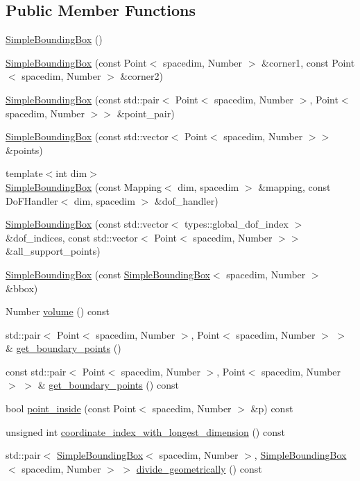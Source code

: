 \subsection*{Public Member Functions}
\begin{DoxyCompactItemize}
\item 
\hyperlink{classSimpleBoundingBox_a6975b3ff39148250f0b4dfdd90194653}{Simple\+Bounding\+Box} ()
\item 
\hyperlink{classSimpleBoundingBox_a2ef944074a061d1813d46edb437706df}{Simple\+Bounding\+Box} (const Point$<$ spacedim, Number $>$ \&corner1, const Point$<$ spacedim, Number $>$ \&corner2)
\item 
\hyperlink{classSimpleBoundingBox_a75acd8fd3479b814c7e146d6948c1366}{Simple\+Bounding\+Box} (const std\+::pair$<$ Point$<$ spacedim, Number $>$, Point$<$ spacedim, Number $>$$>$ \&point\+\_\+pair)
\item 
\hyperlink{classSimpleBoundingBox_a4762c89a859a0040438b2f6b44defc79}{Simple\+Bounding\+Box} (const std\+::vector$<$ Point$<$ spacedim, Number $>$$>$ \&points)
\item 
{\footnotesize template$<$int dim$>$ }\\\hyperlink{classSimpleBoundingBox_a41f4805f49de9e15c82063927dd7ef10}{Simple\+Bounding\+Box} (const Mapping$<$ dim, spacedim $>$ \&mapping, const Do\+F\+Handler$<$ dim, spacedim $>$ \&dof\+\_\+handler)
\item 
\hyperlink{classSimpleBoundingBox_ab2568fcda9400b730d326574fa6ef58c}{Simple\+Bounding\+Box} (const std\+::vector$<$ types\+::global\+\_\+dof\+\_\+index $>$ \&dof\+\_\+indices, const std\+::vector$<$ Point$<$ spacedim, Number $>$$>$ \&all\+\_\+support\+\_\+points)
\item 
\hyperlink{classSimpleBoundingBox_adb50933d0b5a524cfa98f79fd231d557}{Simple\+Bounding\+Box} (const \hyperlink{classSimpleBoundingBox}{Simple\+Bounding\+Box}$<$ spacedim, Number $>$ \&bbox)
\item 
Number \hyperlink{classSimpleBoundingBox_a44340fd2ab10e9c05c1a88719958fee5}{volume} () const
\item 
std\+::pair$<$ Point$<$ spacedim, Number $>$, Point$<$ spacedim, Number $>$ $>$ \& \hyperlink{classSimpleBoundingBox_a1cccc2f8ebc6b5f406738f04e145b598}{get\+\_\+boundary\+\_\+points} ()
\item 
const std\+::pair$<$ Point$<$ spacedim, Number $>$, Point$<$ spacedim, Number $>$ $>$ \& \hyperlink{classSimpleBoundingBox_a7c1af5d42bfc12cd3d0c955863fe0d75}{get\+\_\+boundary\+\_\+points} () const
\item 
bool \hyperlink{classSimpleBoundingBox_af58f37fb60a09a61730797850886c39f}{point\+\_\+inside} (const Point$<$ spacedim, Number $>$ \&p) const
\item 
unsigned int \hyperlink{classSimpleBoundingBox_abc665d7750573194c9c449ef67c40113}{coordinate\+\_\+index\+\_\+with\+\_\+longest\+\_\+dimension} () const
\item 
std\+::pair$<$ \hyperlink{classSimpleBoundingBox}{Simple\+Bounding\+Box}$<$ spacedim, Number $>$, \hyperlink{classSimpleBoundingBox}{Simple\+Bounding\+Box}$<$ spacedim, Number $>$ $>$ \hyperlink{classSimpleBoundingBox_a0b8bef0a9504e22a7e2c4cc3d4ed04c4}{divide\+\_\+geometrically} () const
\end{DoxyCompactItemize}
